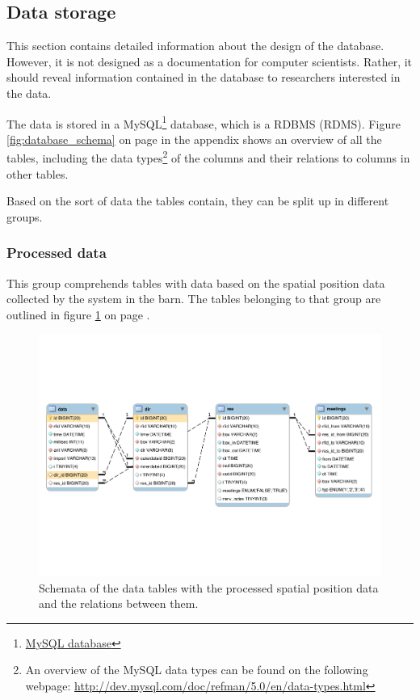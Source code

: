 \subsection{Data storage}
\label{subsec:datastorage}

This section contains detailed information about the design of the database. However, it is not designed as a documentation for computer scientists. Rather, it should reveal information contained in the database to researchers interested in the data.   

The data is stored in a MySQL\footnote{\href{http://www.mysql.com/}{MySQL database}} database, which is  a \acf{RDBMS} (RDMS). Figure \ref{fig:database_schema} on page \pageref{fig:database_schema} in the appendix shows an overview of all the tables, including the data types\footnote{An overview of the MySQL data types can be found on the following webpage: \url{http://dev.mysql.com/doc/refman/5.0/en/data-types.html}} of the columns and their relations to columns in other tables. 

Based on the sort of data the tables contain, they can be split up in different groups.

\subsubsection{Processed data}

This group comprehends tables with data based on the spatial position data collected by the system in the barn. The tables belonging to that group are outlined in figure \ref{fig:processed_data_schema} on page \pageref{fig:processed_data_schema}.
 
\begin{figure}[htpb]
\begin{center}
  \includegraphics[width=\textwidth]{assets/pdf/processed_data_schema.pdf}
  \caption[Schema of database tables with processed data]{Schemata of the data tables with the processed spatial position data and the relations between them.}
  \label{fig:processed_data_schema}
\end{center}
\end{figure}

